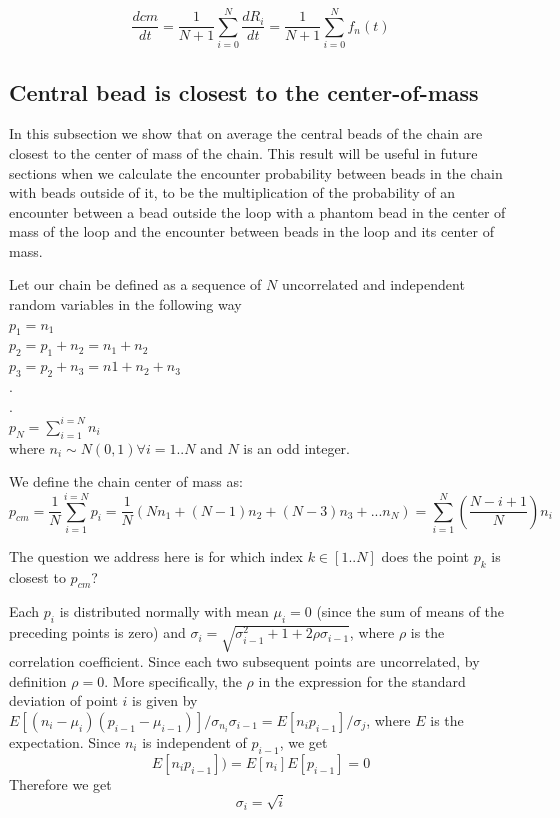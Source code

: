 \documentclass{report}
\begin{document}
\begin{equation*}
\frac{dcm}{dt}=\frac{1}{N+1}\sum_{i=0}^N{\frac{dR_i}{dt}}= \frac{1}{N+1}\sum_{i=0}^Nf_n(t)
\end{equation*}

\subsection{Central bead is closest to the center-of-mass}\label{subsection_centralbeadClosestToCenterOfMass}
In this subsection we show that on average the central beads of the chain are closest to the center of mass of the chain. This result will be useful in future sections when we calculate the encounter probability between beads in the chain with beads outside of it, to be the multiplication of the probability of an encounter between a bead outside the loop with a phantom bead in the center of mass of the loop and the encounter between beads in the loop and its center of mass. 

Let our chain be defined as a sequence of $N$ uncorrelated and independent random variables in the following way\\
$p_1 = n_1$\\
$p_2 = p_1+n_2=n_1+n_2$\\
$p_3 = p_2+n_3=n1+n_2+n_3$\\
.\\
.\\
$p_N = \sum_{i=1}^{i=N}n_i$\\
where $n_i\sim N(0,1)\forall i=1..N$ and $N$ is an odd integer.

We define the chain center of mass as:
\begin{equation*}
p_{cm}=\frac{1}{N}\sum_{i=1}^{i=N}p_i = \frac{1}{N}(Nn_1+(N-1)n_2+(N-3)n_3+...n_N)=\sum_{i=1}^{N}(\frac{N-i+1}{N})n_i
\end{equation*}

The question we address here is for which index $k\in[1..N]$ does the point $p_k$ is closest to $p_{cm}$?

Each $p_i$ is distributed normally with mean $\mu_i =0$ (since the sum of means of the preceding points is zero) and $\sigma_i=\sqrt{\sigma_{i-1}^2+1+2\rho\sigma_{i-1}}$, where $\rho$ is the correlation coefficient. Since each two subsequent points are uncorrelated, by definition $\rho=0$. More specifically, the $\rho$ in the expression for the standard deviation of point $i$ is given by $E[(n_i-\mu_i)(p_{i-1}-\mu_{i-1})]/\sigma_{n_i}\sigma_{i-1}=E[n_ip_{i-1}]/\sigma_j$, where $E$ is the expectation. Since $n_i$ is independent of $p_{i-1}$, we get
\begin{equation*}
E[n_ip_{i-1}])=E[n_i]E[p_{i-1}]=0
\end{equation*}
Therefore we get 
\begin{equation*}
\sigma_i=\sqrt{i}
\end{equation*}
\end{document}
